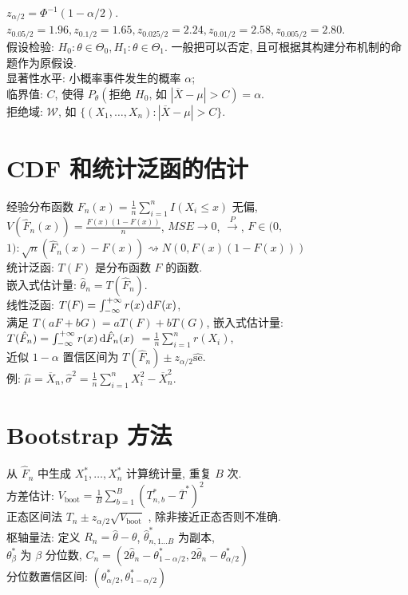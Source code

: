 \documentclass[a4paper, landscape,10pt]{article}
\begin{document}
\begin{multicols}{4}

$z_{\alpha/2} = \Phi^{-1}(1 - \alpha / 2)$. $z_{0.05/2} = 1.96, z_{0.1/2} = 1.65, z_{0.025/2} = 2.24, z_{0.01/2}=2.58, z_{0.005/2}=2.80$. \\
假设检验: $H_0: \theta \in \Theta_0, H_1: \theta \in \Theta_1$. 一般把可以否定, 且可根据其构建分布机制的命题作为原假设. \\
显著性水平: 小概率事件发生的概率 $\alpha$; \\
临界值: $C$, 使得 $P_\theta(\text{拒绝 $H_0$, 如 $|\overline X - \mu| > C$}) = \alpha$.\\
拒绝域: $\mathcal{W}$, 如 $\{ (X_1, \dots, X_n) : |\overline X - \mu| > C\}$.\\
\section{CDF 和统计泛函的估计}
经验分布函数 $F_n(x) = \frac{1}{n} \sum_{i = 1}^n I(X_i \leq x)$
无偏,\\ $V(\hat F_n(x)) = \frac{F(x)(1 - F(x))}{n}$, $MSE \rightarrow 0$, $\xrightarrow{P}$,
$F \in (0,$ $1): \sqrt{n} (\hat F_n(x) - F(x)) \rightsquigarrow N(0, F(x)(1 - F(x)))$\\ 
统计泛函: $T(F)$ 是分布函数 $F$ 的函数. \\
嵌入式估计量: $\hat \theta_n = T(\hat F_n)$. \\
线性泛函: $T(F) = \int_{-\infty}^{+\infty} r(x) \,\mathrm{d} F(x)$, \\
满足 $T(aF + bG) = aT(F) + bT(G)$, 嵌入式估计量: $T(\hat F_n) = \int_{-\infty}^{+\infty} r(x) \,\mathrm{d} \hat F_n(x)$ $= \frac{1}{n} \sum_{i = 1}^n r(X_i)$,\\
近似 $1-\alpha$ 置信区间为 $T(\hat F_n) \pm z_{\alpha/2} \hat {\mathrm{se}}$.\\
例: $\hat \mu = \overline X_n, \hat \sigma^2 = \frac{1}{n} \sum_{i = 1}^n X_i^2 - \overline X_n^2$. \\
\section{Bootstrap 方法}
从 $\hat F_n$ 中生成 $X_1^*, \dots, X_n^*$ 计算统计量, 重复 $B$ 次. \\
方差估计:  $V_{\mathrm{boot}} = \frac{1}{B} \sum_{b = 1}^B (T_{n,b}^* - \overline T^*)^2$\\
正态区间法 $T_n \pm z_{\alpha/2} \sqrt{V_{\mathrm{boot}}}$ , 除非接近正态否则不准确. \\
枢轴量法: 定义 $R_n = \hat \theta - \theta$, $\hat \theta_{n,1 \dots B }^*$ 为副本, \\
$\theta_\beta^*$ 为 $\beta$ 分位数, $C_n = (2 \hat \theta_n - \theta_{1 -\alpha / 2}^*, 2 \hat \theta_n - \theta_{\alpha / 2}^*)$\\
分位数置信区间: $(\theta_{\alpha/2}^*, \theta_{1 - \alpha/2}^*)$ \\

\end{multicols}
\end{document}
